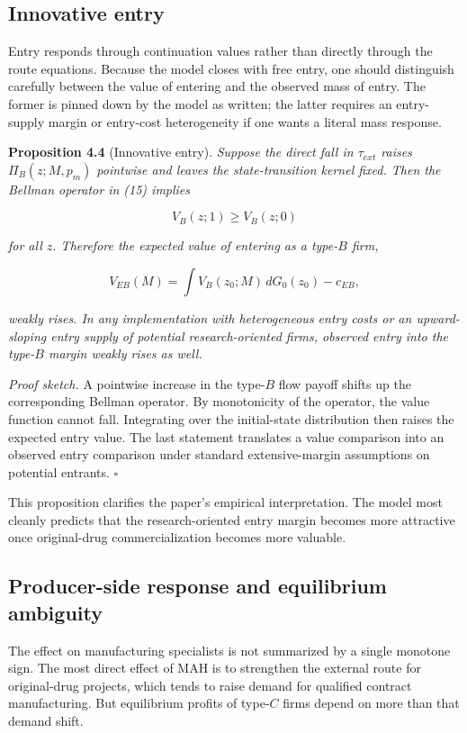 \documentclass[12pt]{article}
\begin{document}
\subsection{Innovative entry}

Entry responds through continuation values rather than directly through the route equations.
Because the model closes with free entry, one should distinguish carefully between the value
of entering and the observed mass of entry. The former is pinned down by the model as
written; the latter requires an entry-supply margin or entry-cost heterogeneity if one wants
a literal mass response.

\textbf{Proposition 4.4} (Innovative entry). \textit{Suppose the direct fall in $\tau_{ext}$ raises
$\Pi_B(z;M,p_m)$ pointwise and leaves the state-transition kernel fixed. Then the Bellman
operator in (15) implies}

\[
V_B(z;1)\ge V_B(z;0)
\]

\textit{for all $z$. Therefore the expected value of entering as a type-$B$ firm,}

\[
V_{EB}(M)=\int V_B(z_0;M)\,dG_0(z_0)-c_{EB},
\]

\textit{weakly rises. In any implementation with heterogeneous entry costs or an upward-sloping entry supply of potential research-oriented firms, observed entry into the type-$B$ margin weakly rises as well.}

\textit{Proof sketch.} A pointwise increase in the type-$B$ flow payoff shifts up the corresponding Bellman operator. By monotonicity of the operator, the value function cannot fall. Integrating over the initial-state distribution then raises the expected entry value. The last statement translates a value comparison into an observed entry comparison under standard extensive-margin assumptions on potential entrants. \hfill$\square$

This proposition clarifies the paper's empirical interpretation. The model most cleanly
predicts that the research-oriented entry margin becomes more attractive once original-drug
commercialization becomes more valuable.

\subsection{Producer-side response and equilibrium ambiguity}

The effect on manufacturing specialists is not summarized by a single monotone sign. The
most direct effect of MAH is to strengthen the external route for original-drug projects,
which tends to raise demand for qualified contract manufacturing. But equilibrium profits of
type-$C$ firms depend on more than that demand shift.
\end{document}
